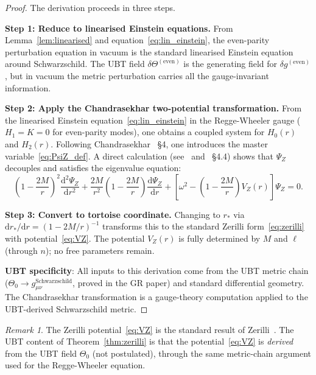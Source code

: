 \documentclass[12pt,a4paper]{article}
\theoremstyle{definition}
\theoremstyle{remark}
\newtheorem{remark}[theorem]{Remark}
\newcommand{\dd}{\mathrm{d}}
\begin{document}
\begin{proof}
The derivation proceeds in three steps.

\textbf{Step 1: Reduce to linearised Einstein equations.}
From Lemma~\ref{lem:linearised} and equation~\eqref{eq:lin_einstein}, the
even-parity perturbation equation in vacuum is the standard linearised
Einstein equation around Schwarzschild.  The UBT field $\delta\Theta^{(\mathrm{even})}$
is the generating field for $\delta g^{(\mathrm{even})}$, but in vacuum
the metric perturbation carries all the gauge-invariant information.

\textbf{Step 2: Apply the Chandrasekhar two-potential transformation.}
From the linearised Einstein equation~\eqref{eq:lin_einstein} in
the Regge-Wheeler gauge ($H_1 = K = 0$ for even-parity modes), one obtains
a coupled system for $H_0(r)$ and $H_2(r)$.  Following
Chandrasekhar~\cite{chandrasekhar1983} §4, one introduces the master
variable~\eqref{eq:PsiZ_def}.  A direct calculation (see~\cite{zerilli1970}
and~\cite{chandrasekhar1983} §4.4) shows that $\Psi_Z$ decouples and satisfies
the eigenvalue equation:
\[
  \left(1 - \frac{2M}{r}\right)^2
  \frac{\dd^2\Psi_Z}{\dd r^2}
  + \frac{2M}{r^2}\!\left(1 - \frac{2M}{r}\right)\frac{\dd\Psi_Z}{\dd r}
  + \left[\omega^2 - \left(1 - \frac{2M}{r}\right)V_Z(r)\right]\Psi_Z = 0.
\]

\textbf{Step 3: Convert to tortoise coordinate.}
Changing to $r_*$ via $\dd r_*/\dd r = (1-2M/r)^{-1}$ transforms this to
the standard Zerilli form~\eqref{eq:zerilli} with potential~\eqref{eq:VZ}.
The potential $V_Z(r)$ is fully determined by $M$ and $\ell$ (through $n$);
no free parameters remain.

\textbf{UBT specificity}: All inputs to this derivation come from the UBT metric
chain ($\Theta_0 \to g_{\mu\nu}^{\mathrm{Schwarzschild}}$, proved in the GR
paper) and standard differential geometry.  The Chandrasekhar transformation
is a gauge-theory computation applied to the UBT-derived Schwarzschild metric.
\end{proof}

\begin{remark}
The Zerilli potential~\eqref{eq:VZ} is the standard result of
Zerilli~\cite{zerilli1970}.  The UBT content of Theorem~\ref{thm:zerilli}
is that the potential~\eqref{eq:VZ} is \emph{derived} from the UBT field
$\Theta_0$ (not postulated), through the same metric-chain argument used
for the Regge-Wheeler equation.
\end{remark}

\end{document}
